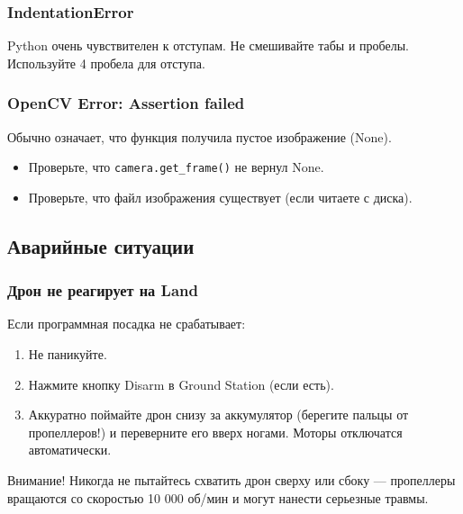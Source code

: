 \subsubsection{IndentationError}
Python очень чувствителен к отступам. Не смешивайте табы и пробелы. Используйте 4 пробела для отступа.

\subsubsection{OpenCV Error: Assertion failed}
Обычно означает, что функция получила пустое изображение (None).
\begin{itemize}
    \item Проверьте, что \texttt{camera.get\_frame()} не вернул None.
    \item Проверьте, что файл изображения существует (если читаете с диска).
\end{itemize}

\subsection{Аварийные ситуации}

\subsubsection{Дрон не реагирует на Land}
Если программная посадка не срабатывает:
\begin{enumerate}
    \item Не паникуйте.
    \item Нажмите кнопку Disarm в Ground Station (если есть).
    \item Аккуратно поймайте дрон снизу за аккумулятор (берегите пальцы от пропеллеров!) и переверните его вверх ногами. Моторы отключатся автоматически.
\end{enumerate}

\begin{warnbox}{Внимание!}
Никогда не пытайтесь схватить дрон сверху или сбоку — пропеллеры вращаются со скоростью 10 000 об/мин и могут нанести серьезные травмы.
\end{warnbox}
